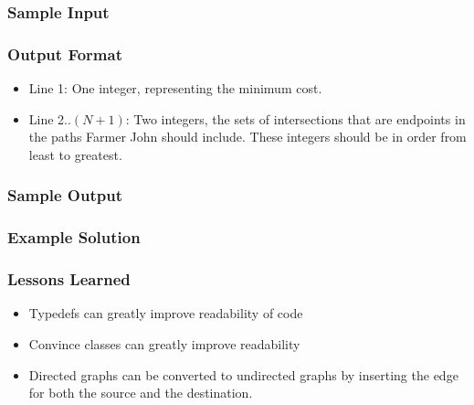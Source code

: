 \subsubsection{Sample Input}
\subsubsection{Output Format}
\begin{itemize}
	\item Line 1: One integer, representing the minimum cost.
	\item Line 2..$(N+1)$: Two integers, the sets of intersections that are endpoints in the paths Farmer John should include.  These integers should be in order from least to greatest.
\end{itemize}
\subsubsection{Sample Output}
\subsubsection{Example Solution}
\subsubsection{Lessons Learned}
\begin{itemize}
	\item Typedefs can greatly improve readability of code
	\item Convince classes can greatly improve readability
	\item Directed graphs can be converted to undirected graphs by inserting the edge for both the source and the destination.
\end{itemize}
